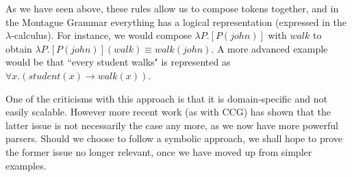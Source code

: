 As we have seen above, these rules allow us to compose tokens together, and in the Montague Grammar everything has a logical representation (expressed in the $\lambda$-calculus). For instance, we would compose $\lambda P.[P(john)]$ with $walk$ to obtain $\lambda P.[P(john)](walk) \equiv walk(john)$. A more advanced example would be that ``every student walks" is represented as $\forall x.(student(x) \to walk(x))$.

\mbox{}

One of the criticisms with this approach \cite{clark_combining_nodate} is that it is domain-specific and not easily scalable. However more recent work (as with CCG) has shown that the latter issue is not necessarily the case any more, as we now have more powerful parsers. Should we choose to follow a symbolic approach, we shall hope to prove the former issue no longer relevant, once we have moved up from simpler examples.